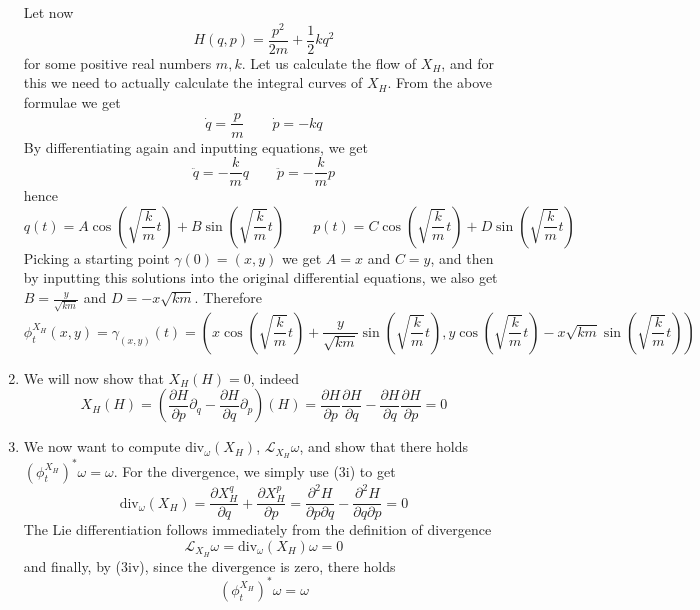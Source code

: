 \documentclass[a4paper, 12pt]{article}
\begin{document}
\begin{Exercise}
\begin{enumerate}[label=(\roman*)]
            Let now
            \[
                H(q, p) = \frac{p^2}{2m} + \frac{1}{2}kq^2
            \]
            for some positive real numbers $m,k$.
            Let us calculate the flow of $X_H$, and for this we need to actually calculate the integral curves of $X_H$.
            From the above formulae we get
            \[
                \dot{q} = \frac{p}{m} \quad \quad \dot{p} = -kq
            \]
            By differentiating again and inputting equations, we get
            \[
                \ddot{q} = -\frac{k}{m}q \quad \quad \ddot{p} = -\frac{k}{m}p
            \]
            hence
            \[
                q(t) = A\cos\left(\sqrt{\frac{k}{m}}t\right) + B\sin\left(\sqrt{\frac{k}{m}}t\right) \quad\quad
                p(t) = C\cos\left(\sqrt{\frac{k}{m}}t\right) + D\sin\left(\sqrt{\frac{k}{m}}t\right)
            \]
            Picking a starting point $\gamma(0) = (x, y)$ we get $A = x$ and $C = y$,
            and then by inputting this solutions into the original differential equations,
            we also get $B = \frac{y}{\sqrt{km}}$ and $D = -x \sqrt{km}$.
            Therefore
            \[
                \phi_t^{X_H}(x, y) = \gamma_{(x, y)}(t) = \left(
                x\cos\left(\sqrt{\frac{k}{m}}t\right) + \frac{y}{\sqrt{km}}\sin\left(\sqrt{\frac{k}{m}}t\right),
                y\cos\left(\sqrt{\frac{k}{m}}t\right) - x\sqrt{km}\sin\left(\sqrt{\frac{k}{m}}t\right)
                \right)
            \]
        \item We will now show that $X_H(H) = 0$, indeed
            \[
                X_H(H)
                = \left( \frac{\partial H}{\partial p} \partial_q - \frac{\partial H}{\partial q} \partial_p \right) (H)
                = \frac{\partial H}{\partial p}\frac{\partial H}{\partial q} - \frac{\partial H}{\partial q}\frac{\partial H}{\partial p}
                = 0
            \]
        \item We now want to compute $\text{div}_\omega(X_H)$, $\mathcal{L}_{X_H}\omega$,
            and show that there holds $(\phi_t^{X_H})^*\omega = \omega$.
            For the divergence, we simply use (3i) to get
            \[
                \text{div}_\omega(X_H)
                = \frac{\partial X_H^q}{\partial q} + \frac{\partial X_H^p}{\partial p}
                = \frac{\partial^2 H}{\partial p \partial q} - \frac{\partial^2 H}{\partial q \partial p}
                = 0
            \]
            The Lie differentiation follows immediately from the definition of divergence
            \[
                \mathcal{L}_{X_H}\omega = \text{div}_\omega (X_H) \omega = 0
            \]
            and finally, by (3iv), since the divergence is zero, there holds
            \[
                (\phi_t^{X_H})^*\omega = \omega
            \]
    \end{enumerate}
\end{Exercise}
\end{document}
